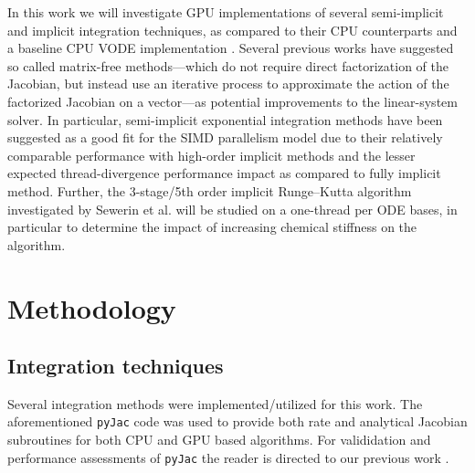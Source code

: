 \documentclass[preprint,12pt]{elsarticle}
\begin{document}
In this work we will investigate GPU implementations of several semi-implicit and implicit integration techniques, as compared to their CPU counterparts and a baseline CPU VODE implementation \cite{Hindmarsh:2005hg}.
Several previous works \cite{Stone:2013aa,Bisetti:2012jw,Niemeyer:2014aa,Perini20141180,McNenly2015581} have suggested so called matrix-free methods---which do not require direct factorization of the Jacobian, but instead use an iterative process to approximate the action of the factorized Jacobian on a vector---as potential improvements to the linear-system solver.
In particular, semi-implicit exponential integration methods have been suggested as a good fit for the SIMD parallelism model \cite{Stone:2013aa,Bisetti:2012jw,Niemeyer:2014aa} due to their relatively comparable performance with high-order implicit methods and the lesser expected thread-divergence performance impact as compared to fully implicit method.
Further, the 3-stage/5th order implicit Runge--Kutta algorithm \cite{hairer1996solving} investigated by Sewerin et al. \cite{Sewerin20151375} will be studied on a one-thread per ODE bases, in particular to determine the impact of increasing chemical stiffness on the algorithm.

\section{Methodology}
\label{sec:Method}

\subsection{Integration techniques}

Several integration methods were implemented/utilized for this work.
The aforementioned \texttt{pyJac} code \cite{Niemeyer:2015im} was used to provide both rate and analytical Jacobian subroutines for both CPU and GPU based algorithms.
For valididation and performance assessments of \texttt{pyJac} the reader is directed to our previous work \cite{Niemeyer:2015ws}.
\end{document}
